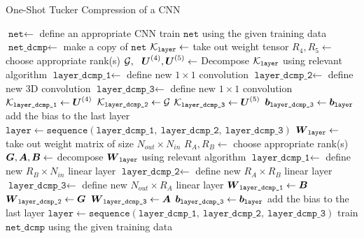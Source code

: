 \begin{algorithm} \caption{One-Shot Tucker Compression of a CNN} \label{alg:one_shot_tucker}
\begin{algorithmic}[1]
    \State $\texttt{net} \leftarrow $ define an appropriate CNN
    \State train $\texttt{net}$ using the given training data
    \State $\texttt{net\_dcmp} \leftarrow $ make a copy of $\texttt{net}$
        \State $\mathcal{K}_{\texttt{layer}} \leftarrow $ take out weight tensor
        \State $R_4, R_5 \leftarrow$ choose appropriate rank(s)
        \State $\tensor{G}, \ \ \bs{U}^{(4)}, \bs{U}^{(5)} \leftarrow $ Decompose $\mathcal{K}_{\texttt{layer}}$ using relevant algorithm 
        \State $\texttt{layer\_dcmp\_1} \leftarrow $ define new $1\times 1$ convolution 
        \State $\texttt{layer\_dcmp\_2} \leftarrow $ define new 3D convolution
        \State $\texttt{layer\_dcmp\_3} \leftarrow $ define new $1\times 1$ convolution 
        \State $\mathcal{K}_{\texttt{layer\_dcmp\_1}} \leftarrow \boldsymbol{U}^{(4)}$ 
        \State $\mathcal{K}_{\texttt{layer\_dcmp\_2}} \leftarrow \mathcal{G}$
        \State $\mathcal{K}_{\texttt{layer\_dcmp\_3}} \leftarrow \boldsymbol{U}^{(5)}$ 
        \State $\boldsymbol{b}_{\texttt{layer\_dcmp\_3}} \leftarrow \boldsymbol{b}_{\texttt{layer}}$ add the bias to the last layer 
        \State $\texttt{layer} \leftarrow \texttt{sequence}(\texttt{layer\_dcmp\_1}, \  \texttt{layer\_dcmp\_2}, \ \texttt{layer\_dcmp\_3})$
    \EndFor
        \State $\boldsymbol{W}_{\texttt{layer}} \leftarrow $ take out weight matrix of size $N_{out} \times N_{in}$
        \State $R_A, R_B \leftarrow $ choose appropriate rank(s)
        \State $\boldsymbol{G}, \boldsymbol{A}, \boldsymbol{B} \leftarrow $ decompose $\boldsymbol{W}_{\texttt{layer}}$ using relevant algorithm 
        \State $\texttt{layer\_dcmp\_1} \leftarrow $ define new $R_B \times N_{in}$ linear layer 
        \State $\texttt{layer\_dcmp\_2} \leftarrow $ define new $R_A \times R_B$ linear layer 
        \State $\texttt{layer\_dcmp\_3} \leftarrow $ define new $N_{out} \times R_A$ linear layer 
        \State $\boldsymbol{W}_{\texttt{layer\_dcmp\_1}} \leftarrow \boldsymbol{B}$ 
        \State $\boldsymbol{W}_{\texttt{layer\_dcmp\_2}} \leftarrow \boldsymbol{G}$
        \State $\boldsymbol{W}_{\texttt{layer\_dcmp\_3}} \leftarrow \boldsymbol{A}$ 
        \State $\boldsymbol{b}_{\texttt{layer\_dcmp\_3}} \leftarrow \boldsymbol{b}_{\texttt{layer}}$ add the bias to the last layer 
        \State $\texttt{layer} \leftarrow \texttt{sequence}(\texttt{layer\_dcmp\_1}, \ \texttt{layer\_dcmp\_2}, \ \texttt{layer\_dcmp\_3})$
    \EndFor
    \State train $\texttt{net\_dcmp}$ using the given training data 
\end{algorithmic}
\end{algorithm}

